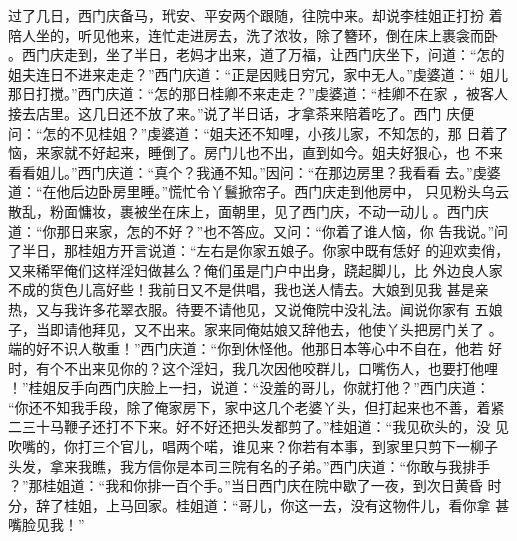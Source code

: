 过了几日，西门庆备马，玳安、平安两个跟随，往院中来。却说李桂姐正打扮
着陪人坐的，听见他来，连忙走进房去，洗了浓妆，除了簪环，倒在床上裹衾而卧
。西门庆走到，坐了半日，老妈才出来，道了万福，让西门庆坐下，问道：“怎的
姐夫连日不进来走走？”西门庆道：“正是因贱日穷冗，家中无人。”虔婆道：“
姐儿那日打搅。”西门庆道：“怎的那日桂卿不来走走？”虔婆道：“桂卿不在家
，被客人接去店里。这几日还不放了来。”说了半日话，才拿茶来陪着吃了。西门
庆便问：“怎的不见桂姐？”虔婆道：“姐夫还不知哩，小孩儿家，不知怎的，那
日着了恼，来家就不好起来，睡倒了。房门儿也不出，直到如今。姐夫好狠心，也
不来看看姐儿。”西门庆道：“真个？我通不知。”因问：“在那边房里？我看看
去。”虔婆道：“在他后边卧房里睡。”慌忙令丫鬟掀帘子。西门庆走到他房中，
只见粉头乌云散乱，粉面慵妆，裹被坐在床上，面朝里，见了西门庆，不动一动儿
。西门庆道：“你那日来家，怎的不好？”也不答应。又问：“你着了谁人恼，你
告我说。”问了半日，那桂姐方开言说道：“左右是你家五娘子。你家中既有恁好
的迎欢卖俏，又来稀罕俺们这样淫妇做甚么？俺们虽是门户中出身，跷起脚儿，比
外边良人家不成的货色儿高好些！我前日又不是供唱，我也送人情去。大娘到见我
甚是亲热，又与我许多花翠衣服。待要不请他见，又说俺院中没礼法。闻说你家有
五娘子，当即请他拜见，又不出来。家来同俺姑娘又辞他去，他使丫头把房门关了
。端的好不识人敬重！”西门庆道：“你到休怪他。他那日本等心中不自在，他若
好时，有个不出来见你的？这个淫妇，我几次因他咬群儿，口嘴伤人，也要打他哩
！”桂姐反手向西门庆脸上一扫，说道：“没羞的哥儿，你就打他？”西门庆道：
“你还不知我手段，除了俺家房下，家中这几个老婆丫头，但打起来也不善，着紧
二三十马鞭子还打不下来。好不好还把头发都剪了。”桂姐道：“我见砍头的，没
见吹嘴的，你打三个官儿，唱两个喏，谁见来？你若有本事，到家里只剪下一柳子
头发，拿来我瞧，我方信你是本司三院有名的子弟。”西门庆道：“你敢与我排手
？”那桂姐道：“我和你排一百个手。”当日西门庆在院中歇了一夜，到次日黄昏
时分，辞了桂姐，上马回家。桂姐道：“哥儿，你这一去，没有这物件儿，看你拿
甚嘴脸见我！”

